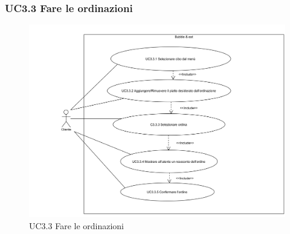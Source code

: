 \subsubsection{UC3.3 Fare le ordinazioni} \label{UC3.3}

\begin{figure}[H]
	\centering
	\includegraphics[width=15cm]{../../documenti/AnalisiDeiRequisiti/Diagrammi_img/uc3_3.png}
	\caption{UC3.3 Fare le ordinazioni}
\end{figure}

